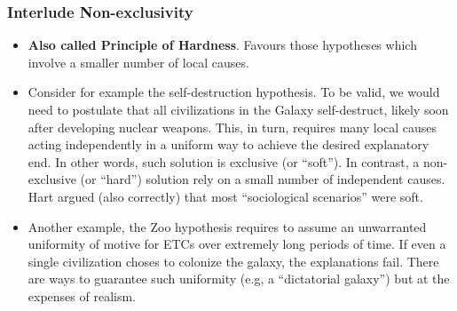 \begin{frame}
\frametitle{Interlude Non-exclusivity}
\begin{itemize}
\item {\bf Also called Principle of Hardness}.  Favours those hypotheses which involve a smaller number of local causes. 
\item Consider for example the self-destruction hypothesis. To be valid, we would need to postulate that all civilizations in the Galaxy self-destruct, likely soon after developing nuclear weapons. This, in turn, requires many local causes acting independently in a uniform way to achieve the desired explanatory end. In other words, such solution is exclusive (or ``soft''). In contrast, a non-exclusive (or ``hard'') solution rely on a small number of independent causes. Hart argued (also correctly) that most ``sociological scenarios'' were soft. 
\item Another example, the Zoo hypothesis requires to assume an unwarranted uniformity of motive for ETCs over extremely long periods of time. If even a single civilization choses to colonize the galaxy, the explanations fail. There are ways to guarantee such uniformity (e.g, a ``dictatorial galaxy'') but at the expenses of realism. 
\end{itemize}

\end{frame}


